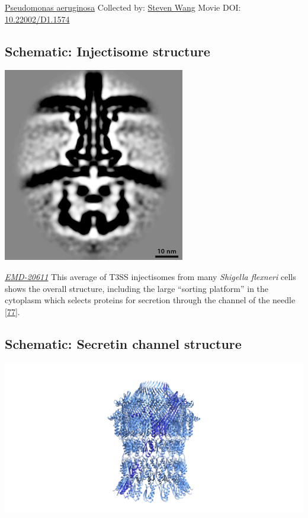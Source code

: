 \documentclass[]{tufte-book}
\begin{document}
\hypertarget{htmlwidget-5591fa6425f501d11604}{}

\label{fig:9-4}\protect\hyperlink{tree}{Pseudomonas aeruginosa} Collected by: \protect\hyperlink{steven_wang}{Steven Wang} Movie DOI: \href{https://doi.org/10.22002/D1.1574}{10.22002/D1.1574}

\hypertarget{Injectisome_structure}{%
\subsection*{Schematic: Injectisome structure}\label{Injectisome_structure}}

\includegraphics{img/schematics/9_4_1}

\href{https://www.ebi.ac.uk/pdbe/entry/emdb/EMD-20611}{\emph{EMD-20611}}
This average of T3SS injectisomes from many \emph{Shigella flexneri} cells shows the overall structure, including the large ``sorting platform'' in the cytoplasm which selects proteins for secretion through the channel of the needle {[}\protect\hyperlink{ref-tachiyama2019}{77}{]}.

\hypertarget{Secretin_channel_structure}{%
\subsection*{Schematic: Secretin channel structure}\label{Secretin_channel_structure}}

\includegraphics{img/schematics/9_4_2}
\end{document}
